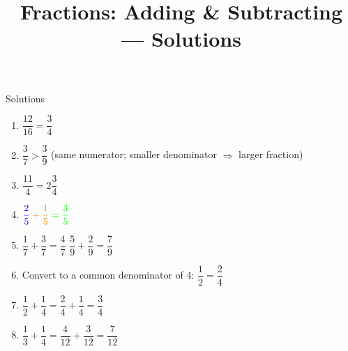 \documentclass{beamer}
\title{Fractions: Adding \& Subtracting --- Solutions}
\author{}
\date{}
\begin{document}
\frame{\titlepage}

\begin{frame}{Solutions}
\vspace{-1em}
\small
\begin{enumerate}
  \item $\dfrac{12}{16} = \dfrac{3}{4}$

  \item $\dfrac{3}{7} > \dfrac{3}{9}$ \quad (same numerator; smaller denominator $\Rightarrow$ larger fraction)

  \item $\dfrac{11}{4} = 2\dfrac{3}{4}$

  \item $\color{blue}\dfrac{2}{5} \color{orange}+ \dfrac{1}{5} \color{green}= \dfrac{3}{5}$

  \item $\dfrac{1}{7} + \dfrac{3}{7} = \dfrac{4}{7}$ \qquad $\dfrac{5}{9} + \dfrac{2}{9} = \dfrac{7}{9}$

  \item Convert to a common denominator of 4: $\dfrac{1}{2} = \dfrac{2}{4}$

  \item $\dfrac{1}{2} + \dfrac{1}{4} = \dfrac{2}{4} + \dfrac{1}{4} = \dfrac{3}{4}$

  \item $\dfrac{1}{3} + \dfrac{1}{4} = \dfrac{4}{12} + \dfrac{3}{12} = \dfrac{7}{12}$
\end{enumerate}
\end{frame}
\end{document}
